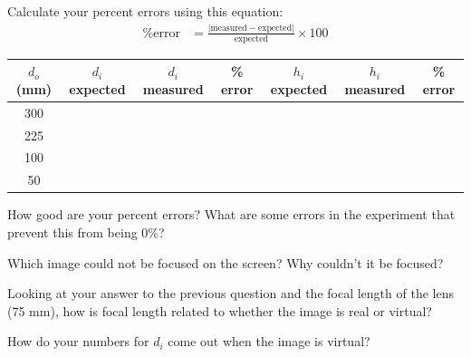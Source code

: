 \documentclass[10pt]{exam}
\begin{document}
\begin{questions}


\question
Calculate your percent errors using this equation:
%
\begin{align*}
  \text{\% error} &= 
  \frac{\left| 
    \text{measured} - \text{expected} 
  \right|}{
    \text{expected}
  } 
  \times 100
\end{align*}


\begin{EnvFullwidth}
  \renewcommand{\arraystretch}{3}
  \begin{center}
    \begin{tabular}{|c|c|c|c||c|c|c|}
      \hline
      \textbf{$d_o$ (mm)} & \textbf{$d_i$ expected} & \textbf{$d_i$ measured} & \textbf{\% error} & \textbf{$h_i$ expected} & \textbf{$h_i$ measured} & \textbf{\% error} \\\hline
      300 & & & & & & \\\hline
      225 & & & & & & \\\hline
      100 & & & & & & \\\hline
      50  & & & & & & \\\hline
    \end{tabular}
  \end{center}
\end{EnvFullwidth}

\pagebreak

\question
How good are your percent errors? What are some errors in the experiment that prevent this from being 0\%?

\vs

\question
Which image could not be focused on the screen? Why couldn’t it be focused?

\vs

\question
Looking at your answer to the previous question and the focal length of the lens (75 mm), how is focal length related to whether the image is real or virtual?

\vs

\question
How do your numbers for $d_i$ come out when the image is virtual?

\vs

\end{questions}
\end{document}
